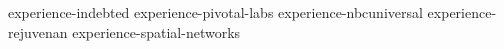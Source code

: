 {experience-indebted}
{experience-pivotal-labs}
{experience-nbcuniversal}
{experience-rejuvenan}
{experience-spatial-networks}
